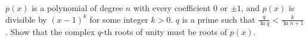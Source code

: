 $p(x)$ is a polynomial of degree $n$ with every coefficient $0 $ or $\pm1$, and $p(x)$ is divisible by $ (x - 1)^k$ for some integer $ k > 0$. $q$ is a prime such that $\frac{q}{\ln q}< \frac{k}{\ln n+1}$. Show that the complex $q$-th roots of unity must be roots of $ p(x). $